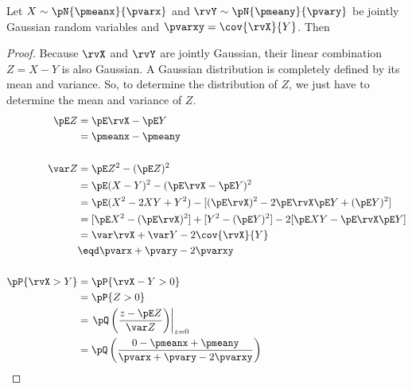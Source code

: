 \begin{proposition}
Let $X\sim\pN{\pmeanx}{\pvarx}$ and $\rvY\sim\pN{\pmeany}{\pvary}$ be
jointly Gaussian random variables and $\pvarxy=\cov{\rvX}{Y}$.
Then
\end{proposition}
\begin{proof}
Because $\rvX$ and $\rvY$ are jointly Gaussian,
their linear combination $Z=X-Y$ is also Gaussian.
A Gaussian distribution is completely defined by its mean and variance.
So, to determine the distribution of $Z$,
we just have to determine the mean and variance of $Z$.
\begin{align*}
  \pE Z
    &= \pE\rvX - \pE Y
  \\&= \pmeanx - \pmeany
\\
\\
  \var Z
    &= \pE Z^2 - (\pE Z)^2
  \\&= \pE (X-Y)^2 - (\pE\rvX - \pE Y)^2
  \\&= \pE (X^2-2XY+Y^2) - [(\pE\rvX)^2 -2\pE\rvX \pE Y + (\pE Y)^2 ]
  \\&= [\pE X^2- (\pE\rvX)^2]  + [Y^2- (\pE Y)^2] - 2[\pE XY - \pE\rvX \pE Y]
  \\&= \var\rvX + \var Y - 2\cov{\rvX}{Y}
  \\&\eqd \pvarx + \pvary -2\pvarxy
\\
\\
  \pP{\rvX>Y}
    &= \pP{\rvX-Y>0}
  \\&= \pP{Z>0}
  \\&= \left.\pQ\left(\frac{z-\pE Z}{\var Z} \right)\right|_{z=0}
  \\&= \pQ\left(\frac{0-\pmeanx+\pmeany}{\pvarx+\pvary-2\pvarxy} \right)
\end{align*}
\end{proof}

